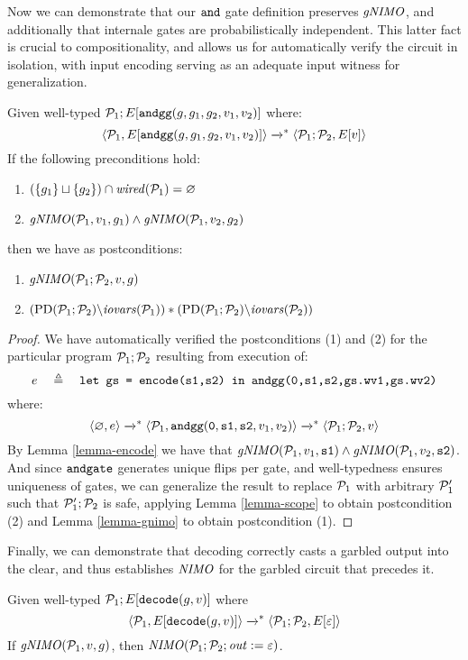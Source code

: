 Now we can demonstrate that our $\texttt{and}$ gate definition preserves
$\mathit{gNIMO}$, and additionally that internale gates are probabilistically independent.
This latter fact is crucial to compositionality, and allows us for automatically
verify the circuit in isolation, with input encoding serving as an adequate input
witness for generalization. 
\begin{lemma}
  \label{lemma-compose}
Given well-typed $\mathcal{P}_1;E[\texttt{andgg}(g,g_1,g_2,v_1,v_2)]$ where:
$$
\langle \mathcal{P}_1,E[\texttt{andgg}(g,g_1,g_2,v_1,v_2)] \rangle \xrightarrow{}^{*} \langle \mathcal{P}_1;\mathcal{P}_2,E[v] \rangle
$$
If the following preconditions hold:
\begin{enumerate}
\item $(\{ g_1 \} \sqcup \{ g_2 \}) \cap \mathit{wired}(\mathcal{P}_1) = \varnothing$
\item $\mathit{gNIMO}(\mathcal{P}_1,v_1,g_1) \wedge \mathit{gNIMO}(\mathcal{P}_1,v_2,g_2)$ 
\end{enumerate}
then we have as postconditions:
\begin{enumerate}
  \item $\mathit{gNIMO}(\mathcal{P}_1;\mathcal{P}_2,v,g)$
  \item $(\mathrm{PD}(\mathcal{P}_1;\mathcal{P}_2)\backslash\mathit{iovars}(\mathcal{P}_1)) * (\mathrm{PD}(\mathcal{P}_1;\mathcal{P}_2)\backslash\mathit{iovars}(\mathcal{P}_2))$
\end{enumerate}
\end{lemma}
\begin{proof}
  We have automatically verified the postconditions (1) and (2) for the particular
  program $\mathcal{P}_1;\mathcal{P}_2$ resulting from execution of:
  $$e\quad \triangleq\quad \texttt{let gs = encode(s1,s2) in andgg(0,s1,s2,gs.wv1,gs.wv2)}$$
  where:
  $$
  \langle \varnothing,e \rangle \xrightarrow{}^{*}
  \langle \mathcal{P}_1,\texttt{andgg}(\texttt{0},\texttt{s1},\texttt{s2},v_1,v_2) \rangle \xrightarrow{}^{*} \langle \mathcal{P}_1;\mathcal{P}_2,v \rangle
  $$
  By Lemma \ref{lemma-encode} we have that
  $\mathit{gNIMO}(\mathcal{P}_1,v_1,\texttt{s1}) \wedge \mathit{gNIMO}(\mathcal{P}_1,v_2,\texttt{s2})$. 
  And since $\texttt{andgate}$ generates unique flips per gate, and well-typedness ensures
  uniqueness of gates, we can generalize the result to replace $\mathcal{P}_1$ with arbitrary $\mathcal{P}_1'$
  such that $\mathcal{P}_1';\mathcal{P}_2$ is safe,
  applying Lemma \ref{lemma-scope} to obtain postcondition (2) and Lemma \ref{lemma-gnimo}
  to obtain postcondition (1). 
\end{proof}
Finally, we can demonstrate that decoding correctly casts a garbled output into the
clear, and thus establishes $\mathit{NIMO}$ for the garbled circuit that precedes it.
\begin{lemma}[Decoding]
  \label{lemma-decode}
Given well-typed $\mathcal{P}_1;E[\texttt{decode}(g,v)]$ where
$$
\langle \mathcal{P}_1,E[\texttt{decode}(g,v)] \rangle \xrightarrow{}^{*} \langle \mathcal{P}_1;\mathcal{P}_2,E[\varepsilon] \rangle
$$
If $\mathit{gNIMO}(\mathcal{P}_1,v,g)$, then $\mathit{NIMO}(\mathcal{P}_1;\mathcal{P}_2;\mathit{out} := \varepsilon)$.
\end{lemma}
